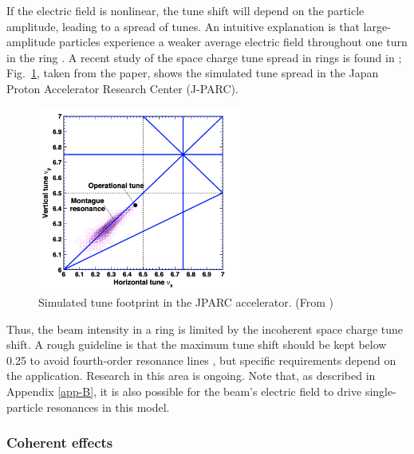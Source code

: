 If the electric field is nonlinear, the tune shift will depend on the particle amplitude, leading to a spread of tunes. An intuitive explanation is that large-amplitude particles experience a weaker average electric field throughout one turn in the ring \cite{Franchetti2017}. A recent study of the space charge tune spread in rings is found in \cite{Hotchi2020}; Fig.~\ref{fig:jparc_montague}, taken from the paper, shows the simulated tune spread in the Japan Proton Accelerator Research Center (J-PARC).
%
\begin{figure}[!p]
    \centering
    \includegraphics[width=0.6\textwidth]{Images/chapter1/montague.png}
    \caption{Simulated tune footprint in the JPARC accelerator. (From \cite{Hotchi2020})}
    \label{fig:jparc_montague}
\end{figure}
%

Thus, the beam intensity in a ring is limited by the incoherent space charge tune shift. A rough guideline is that the maximum tune shift should be kept below 0.25 to avoid fourth-order resonance lines \cite{book:Reiser}, but specific requirements depend on the application. Research in this area is ongoing. Note that, as described in Appendix \ref{app-B}, it is also possible for the beam's electric field to drive single-particle resonances in this model.



\subsubsection{Coherent effects}

